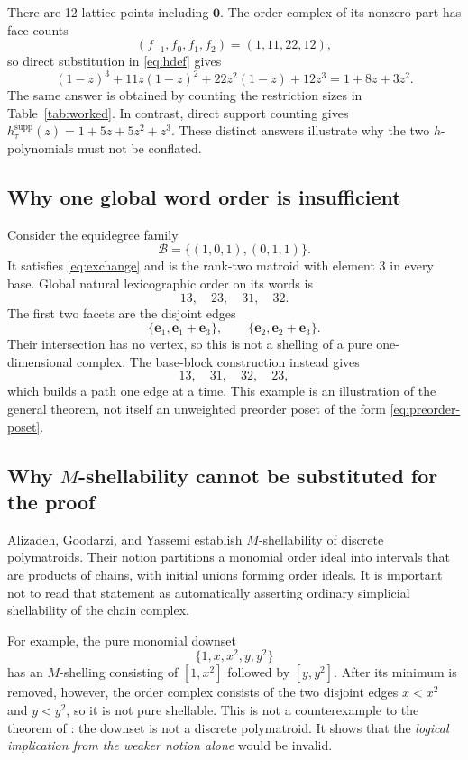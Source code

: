 \documentclass[11pt]{article}
\numberwithin{equation}{section}
\theoremstyle{definition}
\theoremstyle{remark}
\newcommand{\ee}{\mathbf e}
\newcommand{\zero}{\mathbf 0}
\newcommand{\B}{\mathcal B}
\begin{document}
There are 12 lattice points including $\zero$. The order complex of its
nonzero part has face counts
\[
 (f_{-1},f_0,f_1,f_2)=(1,11,22,12),
\]
so direct substitution in \eqref{eq:hdef} gives
\[
 (1-z)^3+11z(1-z)^2+22z^2(1-z)+12z^3
       =1+8z+3z^2.
\]
The same answer is obtained by counting the restriction sizes in
Table~\ref{tab:worked}. In contrast, direct support counting gives
$h_\tau^{\mathrm{supp}}(z)=1+5z+5z^2+z^3$. These distinct answers illustrate
why the two $h$-polynomials must not be conflated.

\subsection{Why one global word order is insufficient}

Consider the equidegree family
\[
 \B=\{(1,0,1),(0,1,1)\}.
\]
It satisfies \eqref{eq:exchange} and is the rank-two matroid with element 3
in every base. Global natural lexicographic order on its words is
\[
 13,\quad23,\quad31,\quad32.
\]
The first two facets are the disjoint edges
\[
 \{\ee_1,\ee_1+\ee_3\},\qquad
 \{\ee_2,\ee_2+\ee_3\}.
\]
Their intersection has no vertex, so this is not a shelling of a pure
one-dimensional complex. The base-block construction instead gives
\[
 13,\quad31,\quad32,\quad23,
\]
which builds a path one edge at a time. This example is an illustration of
the general theorem, not itself an unweighted preorder poset of the form
\eqref{eq:preorder-poset}.

\subsection{Why \texorpdfstring{$M$}{M}-shellability cannot be substituted for the proof}

Alizadeh, Goodarzi, and Yassemi \cite{AGY} establish $M$-shellability of
discrete polymatroids. Their notion partitions a monomial order ideal into
intervals that are products of chains, with initial unions forming order
ideals. It is important not to read that statement as automatically asserting
ordinary simplicial shellability of the chain complex.

For example, the pure monomial downset
\[
 \{1,x,x^2,y,y^2\}
\]
has an $M$-shelling consisting of $[1,x^2]$ followed by $[y,y^2]$. After its
minimum is removed, however, the order complex consists of the two disjoint
edges $x<x^2$ and $y<y^2$, so it is not pure shellable. This is not a
counterexample to the theorem of \cite{AGY}: the downset is not a discrete
polymatroid. It shows that the \emph{logical implication from the weaker
notion alone} would be invalid.
\end{document}
